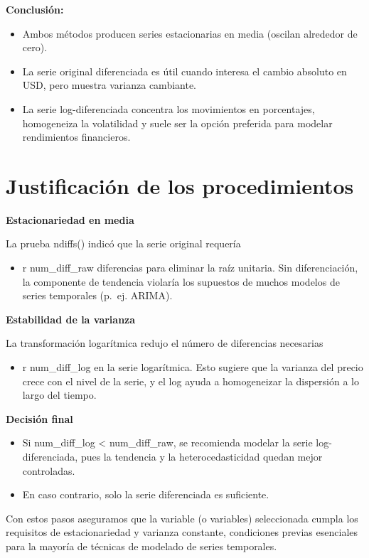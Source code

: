 \documentclass[
  11pt,
]{book}
\providecommand{\tightlist}{%
  \setlength{\itemsep}{0pt}\setlength{\parskip}{0pt}}
\begin{document}
\textbf{Conclusión:}

\begin{itemize}
\item
  Ambos métodos producen series estacionarias en media (oscilan alrededor de cero).
\item
  La serie original diferenciada es útil cuando interesa el cambio absoluto en USD, pero muestra varianza cambiante.
\item
  La serie log-diferenciada concentra los movimientos en porcentajes, homogeneiza la volatilidad y suele ser la opción preferida para modelar rendimientos financieros.
\end{itemize}

\section{Justificación de los procedimientos}\label{justificaciuxf3n-de-los-procedimientos}

\textbf{Estacionariedad en media}

La prueba ndiffs() indicó que la serie original requería

\begin{itemize}
\tightlist
\item
  r num\_diff\_raw diferencias para eliminar la raíz unitaria.
  Sin diferenciación, la componente de tendencia violaría los supuestos de muchos modelos de series temporales (p.~ej. ARIMA).
\end{itemize}

\textbf{Estabilidad de la varianza}

La transformación logarítmica redujo el número de diferencias necesarias

\begin{itemize}
\tightlist
\item
  r num\_diff\_log en la serie logarítmica.
  Esto sugiere que la varianza del precio crece con el nivel de la serie, y el log ayuda a homogeneizar la dispersión a lo largo del tiempo.
\end{itemize}

\textbf{Decisión final}

\begin{itemize}
\item
  Si num\_diff\_log \textless{} num\_diff\_raw, se recomienda modelar la serie log-diferenciada, pues la tendencia y la heterocedasticidad quedan mejor controladas.
\item
  En caso contrario, solo la serie diferenciada es suficiente.
\end{itemize}

Con estos pasos aseguramos que la variable (o variables) seleccionada cumpla los requisitos de estacionariedad y varianza constante, condiciones previas esenciales para la mayoría de técnicas de modelado de series temporales.
\end{document}
